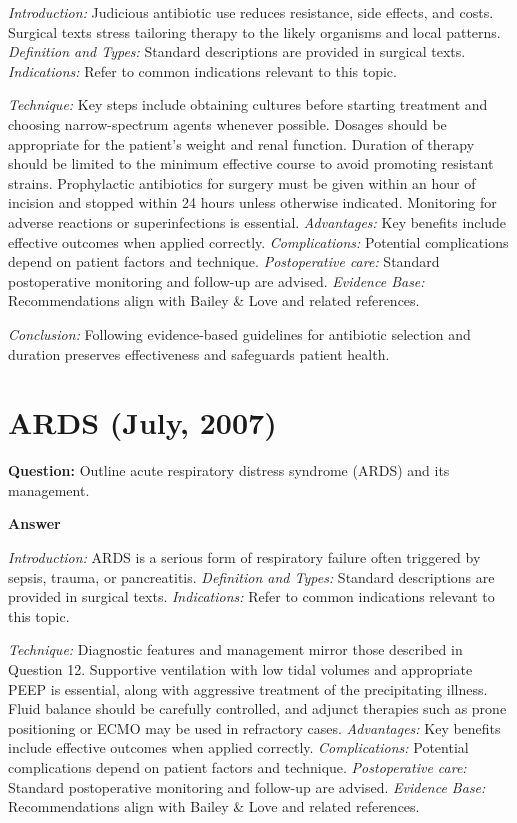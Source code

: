 \documentclass{article}
\begin{document}
\emph{Introduction:} Judicious antibiotic use reduces resistance, side effects, and costs. Surgical texts stress tailoring therapy to the likely organisms and local patterns.
\emph{Definition and Types:} Standard descriptions are provided in surgical texts.
\emph{Indications:} Refer to common indications relevant to this topic.

\emph{Technique:} Key steps include obtaining cultures before starting treatment and choosing narrow-spectrum agents whenever possible. Dosages should be appropriate for the patient's weight and renal function. Duration of therapy should be limited to the minimum effective course to avoid promoting resistant strains. Prophylactic antibiotics for surgery must be given within an hour of incision and stopped within 24 hours unless otherwise indicated. Monitoring for adverse reactions or superinfections is essential.
\emph{Advantages:} Key benefits include effective outcomes when applied correctly.
\emph{Complications:} Potential complications depend on patient factors and technique.
\emph{Postoperative care:} Standard postoperative monitoring and follow-up are advised.
\emph{Evidence Base:} Recommendations align with Bailey & Love and related references.

\emph{Conclusion:} Following evidence-based guidelines for antibiotic selection and duration preserves effectiveness and safeguards patient health.


\section{ARDS (July, 2007)}

\textbf{Question:} Outline acute respiratory distress syndrome (ARDS) and its management.

\textbf{Answer}

\emph{Introduction:} ARDS is a serious form of respiratory failure often triggered by sepsis, trauma, or pancreatitis.
\emph{Definition and Types:} Standard descriptions are provided in surgical texts.
\emph{Indications:} Refer to common indications relevant to this topic.

\emph{Technique:} Diagnostic features and management mirror those described in Question 12. Supportive ventilation with low tidal volumes and appropriate PEEP is essential, along with aggressive treatment of the precipitating illness. Fluid balance should be carefully controlled, and adjunct therapies such as prone positioning or ECMO may be used in refractory cases.
\emph{Advantages:} Key benefits include effective outcomes when applied correctly.
\emph{Complications:} Potential complications depend on patient factors and technique.
\emph{Postoperative care:} Standard postoperative monitoring and follow-up are advised.
\emph{Evidence Base:} Recommendations align with Bailey & Love and related references.
\end{document}
